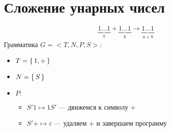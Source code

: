 \section{Сложение унарных чисел}
\[
    \underbrace{1\ldots 1}_{a}+\underbrace{1\ldots 1}_{b} \rightarrow \underbrace{1 \ldots 1}_{a + b}
\]
Грамматика $G = <T, N, P, S>$:
\begin{itemize}
    \item $T = \set{1, +}$
    \item $N = \set{S}$
    \item $P\colon$
        \begin{itemize}
            \item $S' 1\mapsto 1 S'$ --- движемся к символу $+$
            \item $S' + \mapsto \varepsilon$ --- удаляем $+$ и завершаем программу
        \end{itemize}
\end{itemize}

